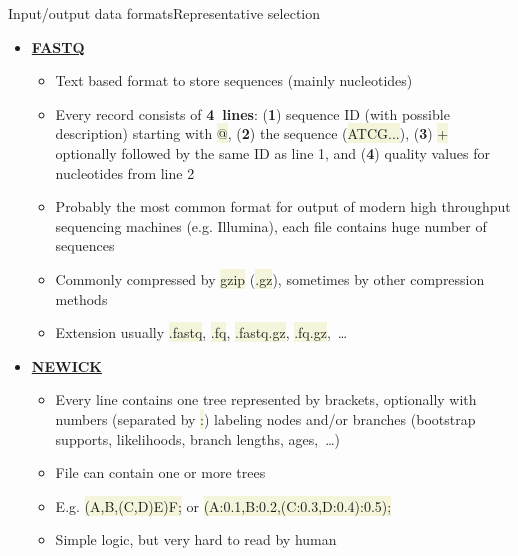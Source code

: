 \documentclass[compress, ucs, xelatex, 11pt, xcolor=svgnames, aspectratio=169,
	hyperref={
		bookmarks=true,
		unicode=true,
		colorlinks=true,
		pdftitle={Molecular data in R},
		plainpages=false,
		pdfauthor={Vojtech Zeisek},
		pdfsubject={Course about phylogeny and evolution in R},
		pdfcreator={XeLaTeX},
		pdfkeywords={R, evolution, phylogeny, molecular data},
		linkcolor=Crimson, %
		anchorcolor=Magenta, %
		citecolor=Magenta, %
		filecolor=Magenta, %
		menucolor=Magenta, %
		urlcolor=DodgerBlue, %
		pdftex},
	url={hyphens, lowtilde} %
	]{beamer}
\renewcommand{\texttt}[1]{\colorbox{Beige}{{\ttfamily #1}}}
\begin{document}
\begin{frame}[allowframebreaks]{Input/output data formats}{Representative selection}
\begin{itemize}
\begin{itemize}
			\item Each sequence can be on single line, or on multiple lines
			\item Can store also alignments (practically sequences of same length, with marked gaps and missing data)
			\item Larger sequences are sometimes compressed (mostly by gzip --- \texttt{*.gz})
			\item Extension usually \texttt{*.fasta} (generic, also \texttt{*.fas}, \texttt{*.fa}, \texttt{*.seq}, \texttt{*.fsa}), \texttt{*.fna} (nucleic acid), \texttt{*.ffn} (nucleotides, coding regions), \texttt{*.faa} (amino acids), \texttt{*.frn} (non-coding RNA),~\ldots
		\end{itemize}
		\item \href{https://en.wikipedia.org/wiki/FASTQ_format}{\textbf{FASTQ}}
		\begin{itemize}
			\item Text based format to store sequences (mainly nucleotides)
			\item Every record consists of \textbf{4~lines}: (\textbf{1}) sequence ID (with possible description) starting with \texttt{@}, (\textbf{2}) the sequence (\texttt{ATCG...}), (\textbf{3}) \texttt{+} optionally followed by the same ID as line 1, and (\textbf{4}) quality values for nucleotides from line 2
			\item Probably the most common format for output of modern high throughput sequencing machines (e.g. Illumina), each file contains huge number of sequences
			\item Commonly compressed by \texttt{gzip} (\texttt{*.gz}), sometimes by other compression methods
			\item Extension usually \texttt{*.fastq}, \texttt{*.fq}, \texttt{*.fastq.gz}, \texttt{*.fq.gz},~\ldots
		\end{itemize}
		\item \href{https://en.wikipedia.org/wiki/Newick_format}{\textbf{NEWICK}}
		\begin{itemize}
			\item Every line contains one tree represented by brackets, optionally with numbers (separated by \texttt{:}) labeling nodes and/or branches (bootstrap supports, likelihoods, branch lengths, ages,~\ldots)
			\item File can contain one or more trees
			\item E.g. \texttt{(A,B,(C,D)E)F;} or \texttt{(A:0.1,B:0.2,(C:0.3,D:0.4):0.5);}
			\item Simple logic, but very hard to read by human

\end{itemize}
\end{itemize}
\end{frame}
\end{document}
